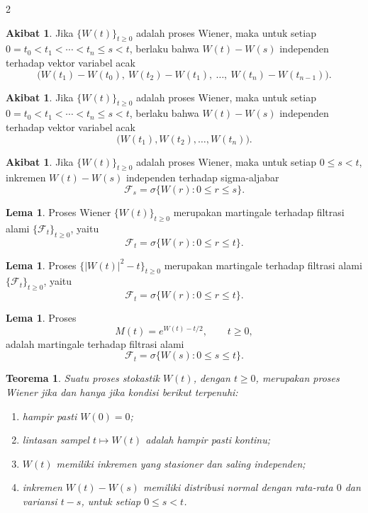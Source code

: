 \documentclass[a4paper,extrafontsizes, 9pt]{memoir}
\theoremstyle{definition}
\newtheorem{lemma}[kalstok]{Lema}
\newtheorem{akibat}[kalstok]{Akibat}
\theoremstyle{plain}
\newtheorem{teorema}[kalstok]{Teorema}
\theoremstyle{remark}
\begin{document}
\begin{multicols}{2}
  \begin{akibat}
    Jika $\{W(t)\}_{t\ge 0}$ adalah proses Wiener, maka untuk setiap
    $0=t_0<t_1<\cdots<t_n\le s<t$, berlaku bahwa $W(t)-W(s)$ independen terhadap vektor variabel
    acak
    \[\bigl(W(t_1)-W(t_0),\ W(t_2)-W(t_1),\ \ldots,\ W(t_n)-W(t_{n-1})\bigr).\]
  \end{akibat}

  \begin{akibat}
    Jika $\{W(t)\}_{t\ge 0}$ adalah proses Wiener, maka untuk setiap
    $0=t_0<t_1<\cdots<t_n\le s<t$, berlaku bahwa $W(t)-W(s)$ independen terhadap vektor variabel
    acak
    \[\bigl(W(t_1),W(t_2),\ldots,W(t_n)\bigr).\]
  \end{akibat}

  \begin{akibat}
    Jika $\{W(t)\}_{t\ge 0}$ adalah proses Wiener, maka untuk setiap $0\le s<t$, inkremen
    $W(t)-W(s)$ independen terhadap sigma-aljabar
    \[\mathcal{F}_s=\sigma\{W(r):0\le r\le s\}.\]
  \end{akibat}

  \begin{lemma}
    Proses Wiener $\{W(t)\}_{t\ge 0}$ merupakan martingale terhadap filtrasi alami
    $\{\mathcal{F}_t\}_{t\ge 0}$, yaitu
    \[\mathcal{F}_t=\sigma\{W(r):0\le r\le t\}.\]
  \end{lemma}

  \begin{lemma}
    Proses $\{|W(t)|^2-t\}_{t\ge 0}$ merupakan martingale terhadap filtrasi alami
    $\{\mathcal{F}_t\}_{t\ge 0}$, yaitu
    \[\mathcal{F}_t=\sigma\{W(r):0\le r\le t\}.\]
  \end{lemma}

  \begin{lemma}
    Proses
    \[M(t)=e^{W(t)-t/2},\qquad t\ge 0,\]
    adalah martingale terhadap filtrasi alami
    \[\mathcal{F}_t=\sigma\{W(s):0\le s\le t\}.\]
  \end{lemma}

  \begin{teorema}
    Suatu proses stokastik $W(t)$, dengan $t\ge 0$, merupakan proses Wiener jika dan hanya jika
    kondisi berikut terpenuhi:
    \begin{enumerate}[leftmargin=*, itemsep=0.5mm]
      \item hampir pasti $W(0)=0$;
      \item lintasan sampel $t\mapsto W(t)$ adalah hampir pasti kontinu;
      \item $W(t)$ memiliki inkremen yang stasioner dan saling independen;
      \item inkremen $W(t)-W(s)$ memiliki distribusi normal dengan rata-rata $0$ dan variansi
            $t-s$, untuk setiap $0\le s<t$.
    \end{enumerate}
  \end{teorema}


\end{multicols}
\end{document}
